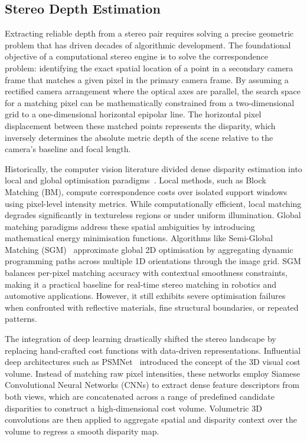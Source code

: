 \subsection{Stereo Depth Estimation}
\label{sec:stereodepth}

Extracting reliable depth from a stereo pair requires solving a precise geometric
problem that has driven decades of algorithmic development. The foundational
objective of a computational stereo engine is to solve the correspondence
problem: identifying the exact spatial location of a point in a secondary camera
frame that matches a given pixel in the primary camera frame. By assuming a
rectified camera arrangement where the optical axes are parallel, the search
space for a matching pixel can be mathematically constrained from a
two-dimensional grid to a one-dimensional horizontal epipolar line. The
horizontal pixel displacement between these matched points represents the
disparity, which inversely determines the absolute metric depth of the scene
relative to the camera's baseline and focal length.

Historically, the computer vision literature divided dense disparity estimation
into local and global optimisation paradigms~\cite{scharstein2002}. Local
methods, such as Block Matching (BM), compute correspondence costs over isolated
support windows using pixel-level intensity metrics. While computationally
efficient, local matching degrades significantly in textureless regions or under
uniform illumination. Global matching paradigms address these spatial ambiguities
by introducing mathematical energy minimisation functions. Algorithms like
Semi-Global Matching (SGM)~\cite{hirschmuller2008} approximate global 2D
optimisation by aggregating dynamic programming paths across multiple 1D
orientations through the image grid. SGM balances per-pixel matching accuracy
with contextual smoothness constraints, making it a practical baseline for
real-time stereo matching in robotics and automotive applications. However, it
still exhibits severe optimisation failures when confronted with reflective
materials, fine structural boundaries, or repeated patterns.

The integration of deep learning drastically shifted the stereo landscape by
replacing hand-crafted cost functions with data-driven representations.
Influential deep architectures such as PSMNet~\cite{chang2018} introduced the
concept of the 3D visual cost volume. Instead of matching raw pixel intensities,
these networks employ Siamese Convolutional Neural Networks (CNNs) to extract
dense feature descriptors from both views, which are concatenated across a range
of predefined candidate disparities to construct a high-dimensional cost volume.
Volumetric 3D convolutions are then applied to aggregate spatial and disparity
context over the volume to regress a smooth disparity map.

